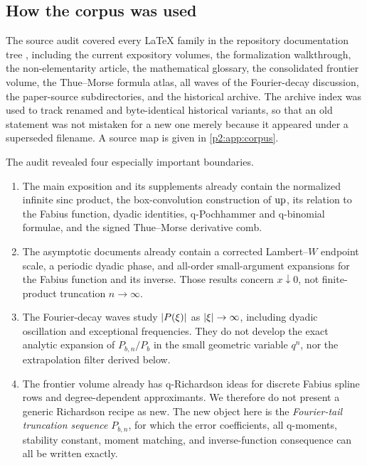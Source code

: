 \documentclass[11pt,oneside]{article}
\numberwithin{equation}{section}
\theoremstyle{definition}
\theoremstyle{remark}
\begin{document}
\subsection{How the corpus was used}

The source audit covered every LaTeX family in the repository documentation tree
\cite{p2:repo}, including the current expository volumes, the formalization walkthrough, the
non-elementarity article, the mathematical glossary, the consolidated frontier
volume, the Thue--Morse formula atlas, all waves of the Fourier-decay discussion,
the paper-source subdirectories, and the historical archive. The archive index
was used to track renamed and byte-identical historical variants, so that an old
statement was not mistaken for a new one merely because it appeared under a
superseded filename. A source map is given in \cref{p2:app:corpus}.

The audit revealed four especially important boundaries.

\begin{enumerate}[label=\textbf{B\arabic*.},leftmargin=12mm]
\item The main exposition and its supplements already contain the normalized
infinite sinc product, the box-convolution construction of \(\operatorname{up}\), its relation
to the Fabius function, dyadic identities, q-Pochhammer and q-binomial formulae,
and the signed Thue--Morse derivative comb.

\item The asymptotic documents already contain a corrected Lambert--\(W\)
endpoint scale, a periodic dyadic phase, and all-order small-argument expansions
for the Fabius function and its inverse. Those results concern
\(x\downarrow0\), not finite-product truncation \(n\to\infty\).

\item The Fourier-decay waves study \(\left\lvert P(\xi)\right\rvert\) as
\(\left\lvert \xi\right\rvert\to\infty\), including dyadic oscillation and exceptional
frequencies. They do not develop the exact analytic expansion of
\(P_{b,n}/P_b\) in the small geometric variable \(q^n\), nor the extrapolation
filter derived below.

\item The frontier volume already has q-Richardson ideas for discrete Fabius
spline rows and degree-dependent approximants. We therefore do not present a
generic Richardson recipe as new. The new object here is the \emph{Fourier-tail
truncation sequence} \(P_{b,n}\), for which the error coefficients, all q-moments,
stability constant, moment matching, and inverse-function consequence can all be
written exactly.
\end{enumerate}
\end{document}
